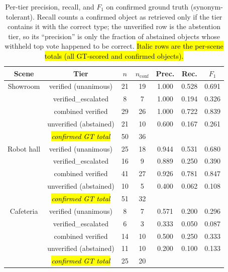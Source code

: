 \documentclass[electronics,article,accept,pdftex,moreauthors]{Definitions/mdpi}
\begin{document}
\begin{table}[H]

\caption{Per-tier precision, recall, and $F_1$ on confirmed ground truth
(synonym-tolerant). Recall counts a confirmed object as retrieved only if
the tier contains it with the correct type; the unverified row is the
abstention tier, so its ``precision'' is only the fraction of abstained
objects whose withheld top vote happened to be correct. \hl{Italic rows are the per-scene totals (all GT-scored and confirmed objects).}}
\label{tab:tierrf}

\begin{tabularx}{\textwidth}{ccCCCCC}
\toprule
\textbf{Scene} & \textbf{Tier} & \boldmath$n$ & \boldmath$n_{\mathrm{conf}}$ & \textbf{Prec.} & \textbf{Rec.} & \boldmath$F_1$ \\
\midrule
Showroom & verified (unanimous) & 21 & 19 & 1.000 & 0.528 & 0.691 \\
 & verified\_escalated & 8 & 7 & 1.000 & 0.194 & 0.326 \\
 & combined verified & 29 & 26 & 1.000 & 0.722 & 0.839 \\
 & unverified (abstained) & 21 & 10 & 0.600 & 0.167 & 0.261 \\
 & \emph{\hl{confirmed GT total}} & 50 & 36 & & & \\%
\midrule
Robot hall & verified (unanimous) & 25 & 18 & 0.944 & 0.531 & 0.680 \\
 & verified\_escalated & 16 & 9 & 0.889 & 0.250 & 0.390 \\
 & combined verified & 41 & 27 & 0.926 & 0.781 & 0.847 \\
 & unverified (abstained) & 10 & 5 & 0.400 & 0.062 & 0.108 \\
 & \emph{\hl{confirmed GT total}} & 51 & 32 & & & \\
\midrule
Cafeteria & verified (unanimous) & 8 & 7 & 0.571 & 0.200 & 0.296 \\
 & verified\_escalated & 6 & 3 & 0.333 & 0.050 & 0.087 \\
 & combined verified & 14 & 10 & 0.500 & 0.250 & 0.333 \\
 & unverified (abstained) & 11 & 10 & 0.200 & 0.100 & 0.133 \\
 & \emph{\hl{confirmed GT total}} & 25 & 20 & & & \\
\bottomrule
\end{tabularx}
\end{table}
\end{document}
